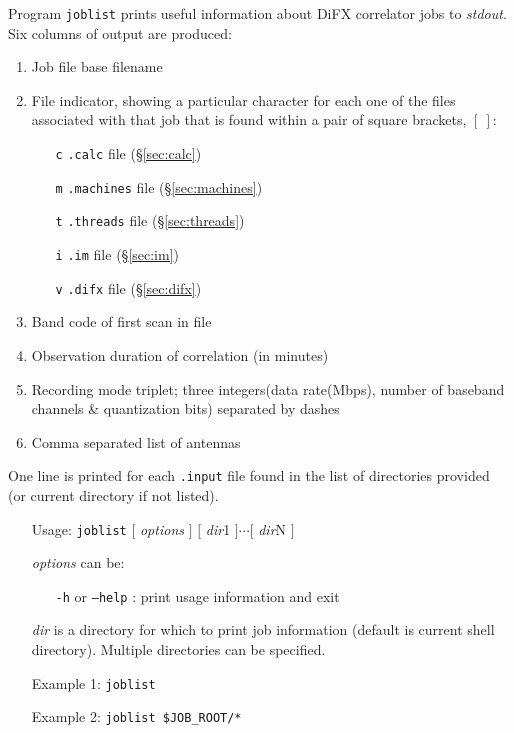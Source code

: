 Program {\tt joblist} prints useful information about DiFX correlator jobs to {\em stdout}.
Six columns of output are produced:
\begin{enumerate}
\item Job file base filename
\item File indicator, showing a particular character for each one of the files associated with that job that is found within a pair of square brackets, $[\ ]$:
\begin{itemize}
\item[{\tt c}] {\tt .calc} file (\S\ref{sec:calc})
\item[{\tt m}] {\tt .machines} file (\S\ref{sec:machines})
\item[{\tt t}] {\tt .threads} file (\S\ref{sec:threads})
\item[{\tt i}] {\tt .im} file (\S\ref{sec:im})
\item[{\tt v}] {\tt .difx} file (\S\ref{sec:difx})
\end{itemize}
\item Band code of first scan in file
\item Observation duration of correlation (in minutes)
\item Recording mode triplet; three integers(data rate(Mbps), number of baseband channels \& quantization bits) separated by dashes
\item Comma separated list of antennas
\end{enumerate}
One line is printed for each {\tt .input} file found in the list of directories provided (or current directory if not listed).

\begin{itemize}
\item[] Usage: {\tt joblist} $[$ {\em options} $]$ $[$ {\em dir}1 $] \cdots [$ {\em dir}N $]$
\item[] {\em options} can be:
\begin{itemize}
\item[] {\tt -h} or {\tt --help} : print usage information and exit
\end{itemize}
\item[] {\em dir} is a directory for which to print job information (default is current shell directory).
Multiple directories can be specified.
\item[] Example 1: {\tt joblist}
\item[] Example 2: {\tt joblist \$JOB\_ROOT/*}
\end{itemize}







